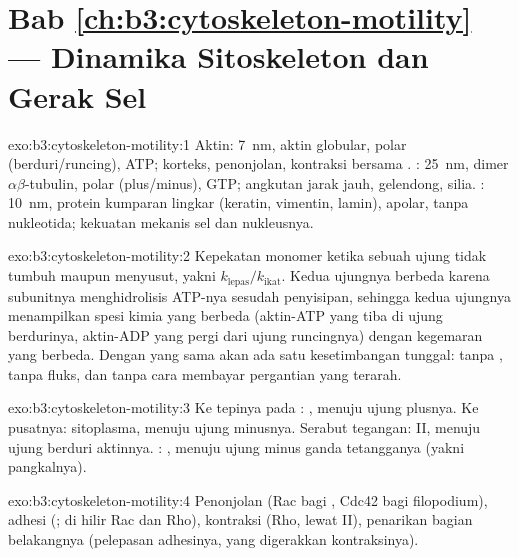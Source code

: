\section*{Bab \ref{ch:b3:cytoskeleton-motility} --- Dinamika Sitoskeleton dan Gerak Sel}

\begin{solution}{exo:b3:cytoskeleton-motility:1}
Aktin: \qty{7}{nm}, aktin globular, polar (berduri/runcing), ATP;
korteks, penonjolan, kontraksi bersama . : \qty{25}{nm},
dimer $\alpha\beta$-tubulin, polar (plus/minus), GTP; angkutan
jarak jauh, gelendong, silia. : \qty{10}{nm},
protein kumparan lingkar (keratin, vimentin, lamin), apolar, tanpa nukleotida;
kekuatan mekanis sel dan nukleusnya.
\end{solution}

\begin{solution}{exo:b3:cytoskeleton-motility:2}
Kepekatan monomer ketika sebuah ujung tidak tumbuh maupun menyusut, yakni
$k_{\text{lepas}}/k_{\text{ikat}}$. Kedua ujungnya berbeda karena subunitnya
menghidrolisis ATP-nya sesudah penyisipan, sehingga kedua ujungnya menampilkan
spesi kimia yang berbeda (aktin-ATP yang tiba di ujung berdurinya, aktin-ADP
yang pergi dari ujung runcingnya) dengan kegemaran yang berbeda. Dengan
 yang sama akan ada satu kesetimbangan tunggal: tanpa , tanpa fluks, dan tanpa cara membayar pergantian yang terarah.
\end{solution}

\begin{solution}{exo:b3:cytoskeleton-motility:3}
Ke tepinya pada : , menuju ujung plusnya. Ke pusatnya:
 sitoplasma, menuju ujung minusnya. Serabut tegangan:  II,
menuju ujung berduri aktinnya. : , menuju
ujung minus ganda tetangganya (yakni pangkalnya).
\end{solution}

\begin{solution}{exo:b3:cytoskeleton-motility:4}
Penonjolan (Rac bagi , Cdc42 bagi filopodium), adhesi
(; di hilir Rac dan Rho), kontraksi (Rho, lewat
 II), penarikan bagian belakangnya (pelepasan adhesinya, yang digerakkan
kontraksinya).
\end{solution}


